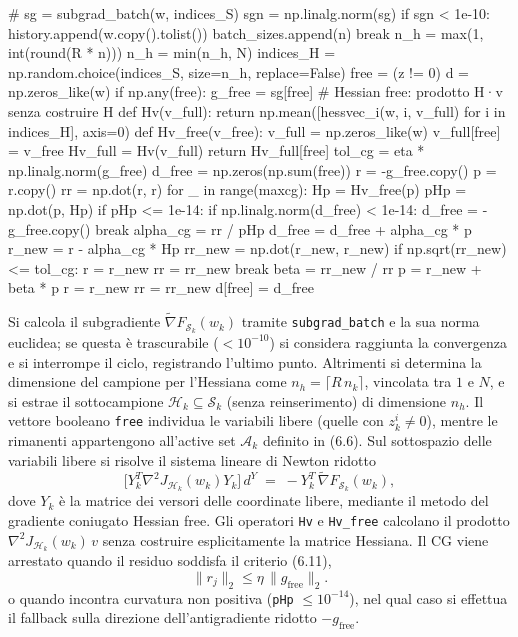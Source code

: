 \documentclass[a4paper,12pt]{article}
\begin{document}
\begin{pythoncode}[title= Newton-L1]

#
        sg = subgrad_batch(w, indices_S)
        sgn = np.linalg.norm(sg)
        if sgn < 1e-10:
            history.append(w.copy().tolist())
            batch_sizes.append(n)
            break
        n_h = max(1, int(round(R * n)))
        n_h = min(n_h, N)
        indices_H = np.random.choice(indices_S, size=n_h, replace=False)
        free = (z != 0)
        d = np.zeros_like(w)
        if np.any(free):
            g_free = sg[free]
            # Hessian free: prodotto H·v senza costruire H 
            def Hv(v_full):
                return np.mean([hessvec_i(w, i, v_full) for i in indices_H], axis=0)
            def Hv_free(v_free):
                v_full = np.zeros_like(w)
                v_full[free] = v_free
                Hv_full = Hv(v_full)
                return Hv_full[free]
            tol_cg = eta * np.linalg.norm(g_free)
            d_free = np.zeros(np.sum(free))
            r = -g_free.copy()
            p = r.copy()
            rr = np.dot(r, r)
            for _ in range(maxcg):
                Hp = Hv_free(p)
                pHp = np.dot(p, Hp)
                if pHp <= 1e-14:
                    if np.linalg.norm(d_free) < 1e-14:
                        d_free = -g_free.copy()
                    break
                alpha_cg = rr / pHp
                d_free = d_free + alpha_cg * p
                r_new = r - alpha_cg * Hp
                rr_new = np.dot(r_new, r_new)
                if np.sqrt(rr_new) <= tol_cg:
                    r = r_new
                    rr = rr_new
                    break
                beta = rr_new / rr
                p = r_new + beta * p
                r = r_new
                rr = rr_new
            d[free] = d_free
\end{pythoncode}
Si calcola il subgradiente $\widetilde{\nabla} F_{\mathcal{S}_k}(w_k)$ tramite \texttt{subgrad\_batch} e la sua norma euclidea; se questa è trascurabile ($<10^{-10}$) si considera raggiunta la convergenza e si interrompe il ciclo, registrando l'ultimo punto. Altrimenti si determina la dimensione del campione per l'Hessiana come $n_h=\lceil R\,n_k\rceil$, vincolata tra $1$ e $N$, e si estrae il sottocampione $\mathcal{H}_k\subseteq\mathcal{S}_k$ (senza reinserimento) di dimensione $n_h$. Il vettore booleano \texttt{free} individua le variabili libere (quelle con $z_k^i\neq 0$), mentre le rimanenti appartengono all'active set $\mathcal{A}_k$ definito in (6.6). Sul sottospazio delle variabili libere si risolve il sistema lineare di Newton ridotto
\[
\bigl[Y_k^T \nabla^2 J_{\mathcal{H}_k}(w_k) Y_k\bigr]\,d^Y \;=\; -Y_k^T\,\widetilde{\nabla}F_{\mathcal{S}_k}(w_k),
\]
dove $Y_k$ è la matrice dei versori delle coordinate libere, mediante il metodo del gradiente coniugato Hessian free. Gli operatori \texttt{Hv} e \texttt{Hv\_free} calcolano il prodotto $\nabla^2 J_{\mathcal{H}_k}(w_k)\,v$ senza costruire esplicitamente la matrice Hessiana. Il CG viene arrestato quando il residuo soddisfa il criterio (6.11),
\[
\|r_j\|_2 \le \eta\,\|g_{\text{free}}\|_2.
\]
o quando incontra curvatura non positiva (\texttt{pHp} $\le 10^{-14}$), nel qual caso si effettua il fallback sulla direzione dell'antigradiente ridotto $-g_{\text{free}}$.
\end{document}
